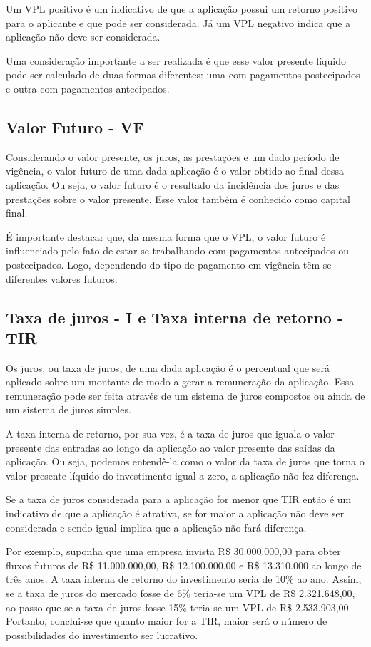 Um VPL positivo é um indicativo de que a aplicação possui um retorno positivo para o aplicante e que pode ser considerada. Já um VPL negativo indica que a aplicação não deve ser considerada. \cite{vpl}

Uma consideração importante a ser realizada é que esse valor presente líquido pode ser calculado de duas formas diferentes: uma com pagamentos postecipados e outra com pagamentos antecipados.

\subsection{Valor Futuro - VF}

Considerando o valor presente, os juros, as prestações e um dado período de vigência, o valor futuro de uma dada aplicação é o valor obtido ao final dessa aplicação. Ou seja, o valor futuro é o resultado da incidência dos juros e das prestações sobre o valor presente. Esse valor também é conhecido como capital final.

É importante destacar que, da mesma forma que o VPL, o valor futuro é influenciado pelo fato de estar-se trabalhando com pagamentos antecipados ou postecipados. Logo, dependendo do tipo de pagamento em vigência têm-se diferentes valores futuros.

\subsection{Taxa de juros - I e Taxa interna de retorno - TIR}

Os juros, ou taxa de juros, de uma dada aplicação é o percentual que será aplicado sobre um montante de modo a gerar a remuneração da aplicação. Essa remuneração pode ser feita através de um sistema de juros compostos ou ainda de um sistema de juros simples.

A taxa interna de retorno, por sua vez, é a taxa de juros que iguala o valor presente das entradas ao longo da aplicação ao valor presente das saídas da aplicação. Ou seja, podemos entendê-la como o valor da taxa de juros que torna o valor presente líquido do investimento igual a zero, a aplicação não fez diferença.

Se a taxa de juros considerada para a aplicação for menor que TIR então é um indicativo de que a aplicação é atrativa, se for maior a aplicação não deve ser considerada e sendo igual implica que a aplicação não fará diferença\cite{irr}. 

Por exemplo, suponha que uma empresa invista R\$ 30.000.000,00 para obter fluxos futuros de R\$ 11.000.000,00, R\$ 12.100.000,00 e R\$ 13.310.000 ao longo de três anos. A taxa interna de retorno do investimento seria de 10\% ao ano. Assim, se a taxa de juros do mercado fosse de 6\% teria-se um VPL de R\$ 2.321.648,00, ao passo que se a taxa de juros fosse 15\% teria-se um VPL de R\$-2.533.903,00. Portanto, conclui-se que quanto maior for a TIR, maior será o número de possibilidades do investimento ser lucrativo. 

